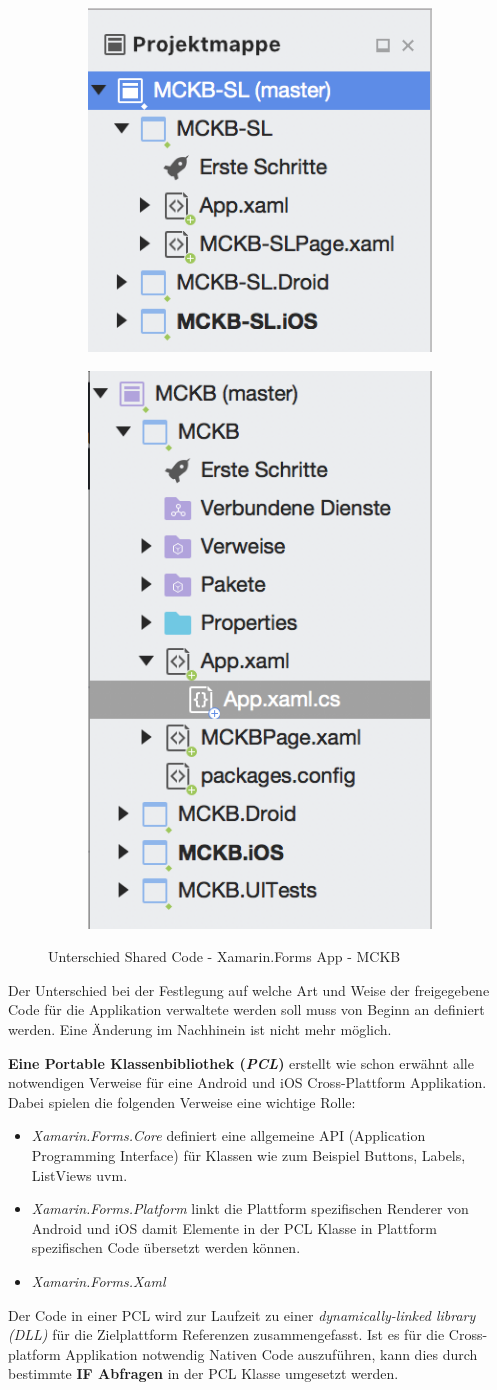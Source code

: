 	\newpage
	\begin{figure}[h!]
		\centering
		\begin{subfigure}
			\centering
			\includegraphics[width=.3\textwidth]{images/xamarin-shared-library.png}
		\end{subfigure}
		\begin{subfigure}
			\centering
			\includegraphics[width=.3\textwidth]{images/xamarin-portable-class.png}
		\end{subfigure}
		\caption{Unterschied Shared Code - Xamarin.Forms App - MCKB}
		\label{fig:xamarinsharedcode}
	\end{figure}

	Der Unterschied bei der Festlegung auf welche Art und Weise der freigegebene Code für die Applikation verwaltete werden soll muss von Beginn an definiert werden. Eine Änderung im Nachhinein ist nicht mehr möglich.

	\textbf{Eine Portable Klassenbibliothek (\textit{PCL})} erstellt wie schon erwähnt alle notwendigen Verweise für eine Android und iOS Cross-Plattform Applikation. Dabei spielen die folgenden Verweise eine wichtige Rolle:
	\begin{itemize}
		\setlength\itemsep{0em}
		\item \textit{Xamarin.Forms.Core} definiert eine allgemeine API (Application Programming Interface) für Klassen wie zum Beispiel Buttons, Labels, ListViews uvm.
		\item \textit{Xamarin.Forms.Platform} linkt die Plattform spezifischen Renderer von Android und iOS damit Elemente in der PCL Klasse in Plattform spezifischen Code übersetzt werden können.
		\item \textit{Xamarin.Forms.Xaml}
	\end{itemize}
	Der Code in einer PCL wird zur Laufzeit zu einer \textit{dynamically-linked library (DLL)} für die Zielplattform Referenzen zusammengefasst. Ist es für die Cross-platform Applikation notwendig Nativen Code auszuführen, kann dies durch bestimmte \textbf{IF Abfragen} in der PCL Klasse umgesetzt werden.\\


